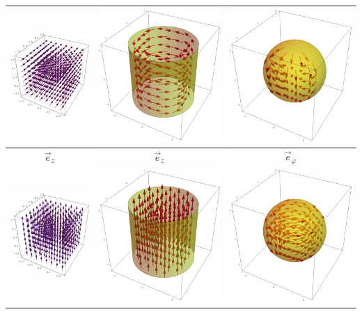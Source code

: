 \begin{tabular}{ c | c | c }
			\includegraphics[width=0.25\columnwidth]{img/kart_y.png} & \includegraphics[width=0.25\columnwidth]{zylindric_phi.png}  &  \includegraphics[width=0.25\columnwidth]{spherical_theta.png} \\
			\hline
				 $\vec{e}_z$  &  $\vec{e}_z$  &  $\vec{e}_\varphi$ \\
			\includegraphics[width=0.25\columnwidth]{img/kart_z.png} & \includegraphics[width=0.25\columnwidth]{zylindric_z.png}  &  \includegraphics[width=0.25\columnwidth]{spherical_phi.png} \\
			\hline

\end{tabular}
\egroup

